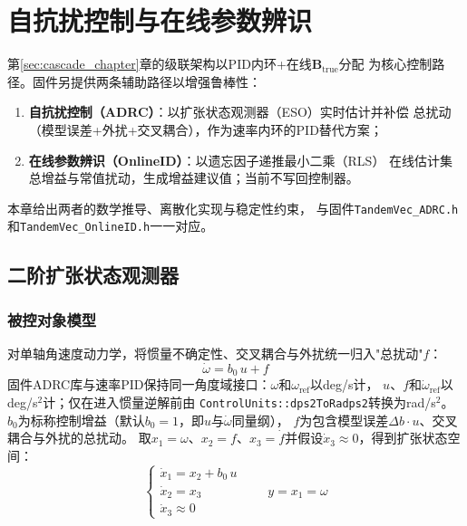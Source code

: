 
\section{自抗扰控制与在线参数辨识}
\label{sec:adrc_onlineid}

第\ref{sec:cascade_chapter}章的级联架构以PID内环+在线$\mathbf{B}_{\mathrm{true}}$分配
为核心控制路径。固件另提供两条辅助路径以增强鲁棒性：
\begin{enumerate}[label=(\arabic*)]
    \item \textbf{自抗扰控制（ADRC）}：以扩张状态观测器（ESO）实时估计并补偿
          总扰动（模型误差+外扰+交叉耦合），作为速率内环的PID替代方案\cite{han2009adrc}；
    \item \textbf{在线参数辨识（OnlineID）}：以遗忘因子递推最小二乘（RLS）
          在线估计集总增益与常值扰动，生成增益建议值；当前不写回控制器。
\end{enumerate}
本章给出两者的数学推导、离散化实现与稳定性约束，
与固件\texttt{TandemVec\_ADRC.h}和\texttt{TandemVec\_OnlineID.h}一一对应。

\subsection{二阶扩张状态观测器}
\label{sec:eso2}

\subsubsection{被控对象模型}

对单轴角速度动力学，将惯量不确定性、交叉耦合与外扰统一归入"总扰动"$f$：
\begin{equation}
    \dot{\omega} = b_0\,u + f
    \label{eq:adrc_plant}
\end{equation}
固件ADRC库与速率PID保持同一角度域接口：$\omega$和$\omega_{\mathrm{ref}}$以deg/s计，
$u$、$f$和$\dot\omega_{\mathrm{ref}}$以deg/s$^2$计；仅在进入惯量逆解前由
\texttt{ControlUnits::dps2ToRadps2}转换为rad/s$^2$。
$b_0$为标称控制增益（默认$b_0=1$，即$u$与$\dot\omega$同量纲），
$f$为包含模型误差$\Delta b\cdot u$、交叉耦合与外扰的总扰动。
取$x_1=\omega$、$x_2=f$、$x_3=\dot f$并假设$\dot x_3\approx0$，得到扩张状态空间：
\begin{equation}
    \begin{cases}
        \dot{x}_1 = x_2 + b_0\,u \\
        \dot{x}_2 = x_3 \\
        \dot{x}_3 \approx 0
    \end{cases}
    \qquad
    y = x_1 = \omega
    \label{eq:eso_plant}
\end{equation}

